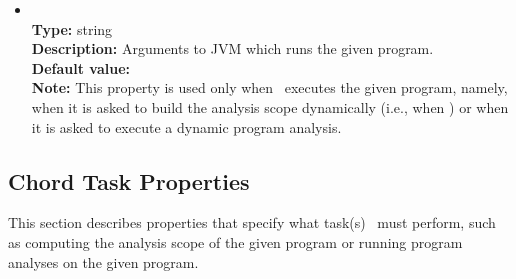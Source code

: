\begin{itemize}
\item
{} \\
{\bf Type:} string \\
{\bf Description:} Arguments to JVM which runs the given program. \\
{\bf Default value:}   \\
{\bf Note:} This property is used only when \Chord\ executes the given program, namely, when it is asked to build the analysis scope dynamically (i.e., when ) or when it is asked to execute a dynamic program analysis.
\end{itemize}

\subsection{Chord Task Properties}
\label{sec:chord-sysprops:task}

This section describes properties that specify what task(s) \Chord\ must perform, 
such as computing the analysis scope of the given program or running program analyses on the given program.


